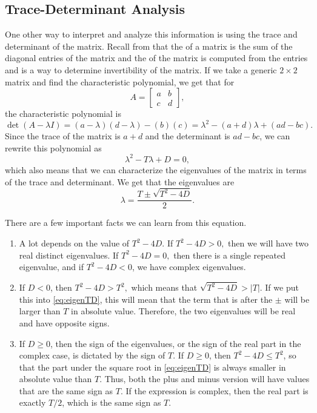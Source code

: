 \subsection{Trace-Determinant Analysis}

One other way to interpret and analyze this information is using the trace and determinant of the matrix. Recall from  that the  of a matrix is the sum of the diagonal entries of the matrix and the  of the matrix is computed from the entries and is a way to determine invertibility of the matrix. If we take a generic $2 \times 2$ matrix and find the characteristic polynomial, we get that for
\begin{equation*}
A = \begin{bmatrix} a & b \\ c & d \end{bmatrix},
\end{equation*}
the characteristic polynomial is 
\begin{equation*}
\det(A - \lambda I) = (a - \lambda)(d - \lambda) - (b)(c) = \lambda^2 - (a+d)\lambda + (ad-bc).
\end{equation*}
Since the trace of the matrix is $a+d$ and the determinant is $ad-bc$, we can rewrite this polynomial as
\begin{equation*}
\lambda^2 - T\lambda + D = 0,
\end{equation*}
which also means that we can characterize the eigenvalues of the matrix in terms of the trace and determinant. We get that the eigenvalues are
\begin{equation}
\lambda = \frac{T \pm \sqrt{T^2 - 4D}}{2}.
\label{eq:eigenTD}
\end{equation}

There are a few important facts we can learn from this equation. 
\begin{enumerate}[1.]
\item A lot depends on the value of $T^2 - 4D$. If $T^2 - 4D > 0,$ then we will have two real distinct eigenvalues. If $T^2 - 4D = 0,$ then there is a single repeated eigenvalue, and if $T^2 - 4D < 0$, we have complex eigenvalues.
\item If $D < 0$, then $T^2 - 4D > T^2,$ which means that $\sqrt{T^2 - 4D} > |T|$. If we put this into \eqref{eq:eigenTD}, this will mean that the term that is after the $\pm$ will be larger than $T$ in absolute value. Therefore, the two eigenvalues will be real and have opposite signs.
\item If $D \geq 0$, then the sign of the eigenvalues, or the sign of the real part in the complex case, is dictated by the sign of $T$. If $D \geq 0$, then $T^2 - 4D \leq T^2$, so that the part under the square root in \eqref{eq:eigenTD} is always smaller in absolute value than $T$. Thus, both the plus and minus version will have values that are the same sign as $T$. If the expression is complex, then the real part is exactly $T/2$, which is the same sign as $T$. 
\end{enumerate}

